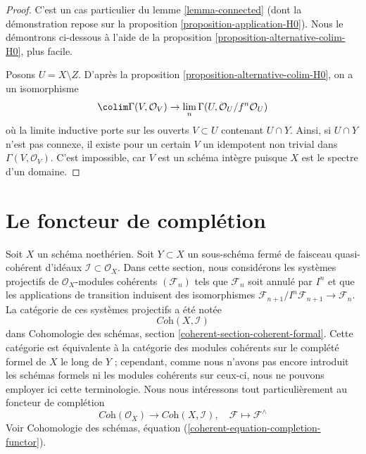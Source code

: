 \begin{proof}
C'est un cas particulier du lemme \ref{lemma-connected} (dont la démonstration
repose sur la proposition \ref{proposition-application-H0}). Nous le
démontrons ci-dessous à l'aide de la proposition \ref{proposition-alternative-colim-H0}, plus facile.

\medskip\noindent
Posons $U = X \setminus Z$. D'après la proposition \ref{proposition-alternative-colim-H0},
on a un isomorphisme
$$
\colim \Gamma(V, \mathcal{O}_V) \to
\lim_n \Gamma(U, \mathcal{O}_U/f^n \mathcal{O}_U)
$$
où la limite inductive porte sur les ouverts $V \subset U$ contenant $U \cap Y$.
Ainsi, si $U \cap Y$ n'est pas connexe, il existe pour un certain $V$
un idempotent non trivial dans $\Gamma(V, \mathcal{O}_V)$. C'est impossible,
car $V$ est un schéma intègre puisque $X$ est le spectre d'un domaine.
\end{proof}






\section{Le foncteur de complétion}
\label{section-completion}

\noindent
Soit $X$ un schéma noethérien. Soit $Y \subset X$ un sous-schéma fermé
de faisceau quasi-cohérent d'idéaux $\mathcal{I} \subset \mathcal{O}_X$.
Dans cette section, nous considérons les systèmes projectifs de
$\mathcal{O}_X$-modules cohérents $(\mathcal{F}_n)$ tels que $\mathcal{F}_n$ soit
annulé par $I^n$ et que les applications de transition induisent des
isomorphismes $\mathcal{F}_{n + 1}/I^n\mathcal{F}_{n + 1} \to \mathcal{F}_n$.
La catégorie de ces systèmes projectifs a été notée
$$
\textit{Coh}(X, \mathcal{I})
$$
dans Cohomologie des schémas, section \ref{coherent-section-coherent-formal}.
Cette catégorie est équivalente à la catégorie des modules cohérents
sur le complété formel de $X$ le long de $Y$ ; cependant, comme nous n'avons
pas encore introduit les schémas formels ni les modules cohérents sur ceux-ci,
nous ne pouvons employer ici cette terminologie. Nous nous intéressons tout particulièrement
au foncteur de complétion
$$
\textit{Coh}(\mathcal{O}_X)
\longrightarrow
\textit{Coh}(X, \mathcal{I}),\quad
\mathcal{F} \longmapsto \mathcal{F}^\wedge
$$
Voir
Cohomologie des schémas, équation (\ref{coherent-equation-completion-functor}).


